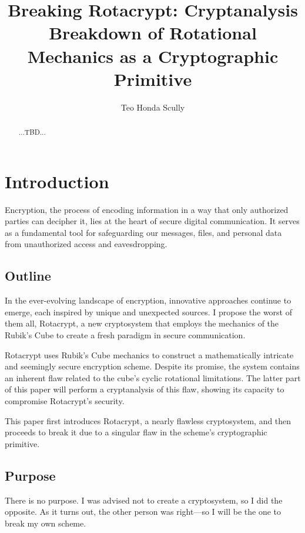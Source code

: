 \documentclass[12pt]{article}
\title{Breaking Rotacrypt: Cryptanalysis Breakdown of Rotational Mechanics as a Cryptographic Primitive}
\author{Teo Honda Scully}
\date{}
\begin{document}
\maketitle

\begin{abstract}
...TBD...
\end{abstract}

\tableofcontents

\newpage

\section{Introduction}

Encryption, the process of encoding information in a way that only authorized parties can decipher it, lies at the heart of secure digital communication. It serves as a fundamental tool for safeguarding our messages, files, and personal data from unauthorized access and eavesdropping.

\subsection{Outline}

In the ever-evolving landscape of encryption, innovative approaches continue to emerge, each inspired by unique and unexpected sources. I propose the worst of them all, Rotacrypt, a new cryptosystem that employs the mechanics of the Rubik's Cube to create a fresh paradigm in secure communication.

Rotacrypt uses Rubik's Cube mechanics to construct a mathematically intricate and seemingly secure encryption scheme. Despite its promise, the system contains an inherent flaw related to the cube's cyclic rotational limitations. The latter part of this paper will perform a cryptanalysis of this flaw, showing its capacity to compromise Rotacrypt's security.

This paper first introduces Rotacrypt, a nearly flawless cryptosystem, and then proceeds to break it due to a singular flaw in the scheme's cryptographic primitive.

\subsection{Purpose}
There is no purpose. I was advised not to create a cryptosystem, so I did the opposite. As it turns out, the other person was right—so I will be the one to break my own scheme.
\end{document}
